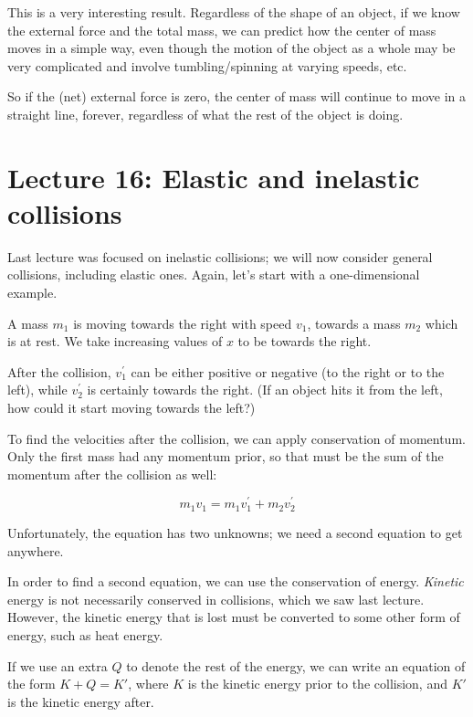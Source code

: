 This is a very interesting result. Regardless of the shape of an object, if we know the external force and the total mass, we can predict how the center of mass moves in a simple way, even though the motion of the object as a whole may be very complicated and involve tumbling/spinning at varying speeds, etc.

So if the (net) external force is zero, the center of mass will continue to move in a straight line, forever, regardless of what the rest of the object is doing.

\section{Lecture 16: Elastic and inelastic collisions}

Last lecture was focused on inelastic collisions; we will now consider general collisions, including elastic ones. Again, let's start with a one-dimensional example.

A mass $m_1$ is moving towards the right with speed $v_1$, towards a mass $m_2$ which is at rest. We take increasing values of $x$ to be towards the right.

After the collision, $v_1^{'}$ can be either positive or negative (to the right or to the left), while $v_2^{'}$ is certainly towards the right. (If an object hits it from the left, how could it start moving towards the left?)

To find the velocities after the collision, we can apply conservation of momentum. Only the first mass had any momentum prior, so that must be the sum of the momentum after the collision as well:

\begin{equation}
m_1 v_1 = m_1 v_1^{'} + m_2 v_2^{'}
\end{equation}

Unfortunately, the equation has two unknowns; we need a second equation to get anywhere.

In order to find a second equation, we can use the conservation of energy. \emph{Kinetic} energy is not necessarily conserved in collisions, which we saw last lecture. However, the kinetic energy that is lost must be converted to some other form of energy, such as heat energy.

If we use an extra $Q$ to denote the rest of the energy, we can write an equation of the form $K + Q = K'$, where $K$ is the kinetic energy prior to the collision, and $K'$ is the kinetic energy after.

